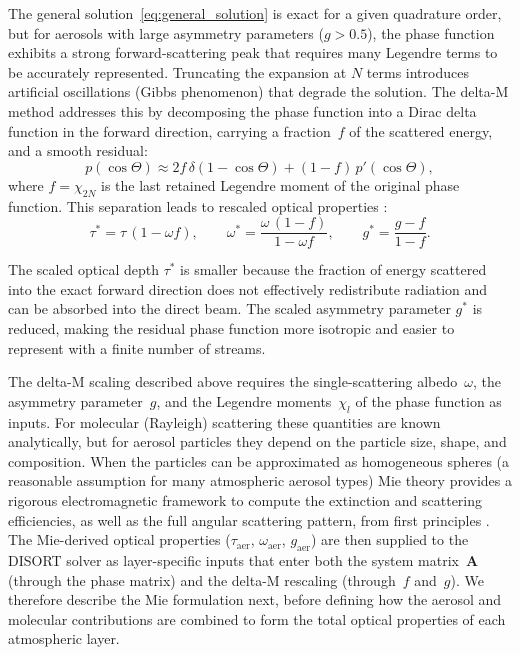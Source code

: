 \documentclass[a4paper, 11pt]{article}
\begin{document}
The general solution~\eqref{eq:general_solution} is exact for a given
quadrature order, but for aerosols with large asymmetry parameters ($g > 0.5$), the phase
function exhibits a strong forward-scattering peak that requires many
Legendre terms to be accurately represented.  Truncating the expansion
at $N$ terms introduces artificial oscillations (Gibbs phenomenon) that
degrade the solution.  The delta-M method \cite{wiscombe1977}
addresses this by decomposing the phase function into a Dirac delta
function in the forward direction, carrying a fraction~$f$ of the
scattered energy, and a smooth residual:
%
\begin{equation}
  p(\cos\Theta) \approx 2f\,\delta(1-\cos\Theta)
  + (1-f)\,p'(\cos\Theta),
  \label{eq:deltam_decomp}
\end{equation}
%
where $f = \chi_{2N}$ is the last retained Legendre moment of the
original phase function.  This separation leads to rescaled optical
properties \cite{wiscombe1977,disortreport}:
%
\begin{equation}
  \tau^* = \tau\,(1 - \omega f),\qquad
  \omega^* = \frac{\omega\,(1-f)}{1 - \omega f},\qquad
  g^* = \frac{g - f}{1 - f}.
  \label{eq:deltam_scaling}
\end{equation}

The scaled optical depth $\tau^*$ is smaller because the fraction of
energy scattered into the exact forward direction does not effectively
redistribute radiation and can be absorbed into the direct beam.
The scaled asymmetry parameter $g^*$ is reduced, making the residual
phase function more isotropic and easier to represent with a finite
number of streams.

The delta-M scaling described above requires the single-scattering
albedo~$\omega$, the asymmetry parameter~$g$, and the Legendre
moments~$\chi_l$ of the phase function as inputs.  For molecular
(Rayleigh) scattering these quantities are known analytically, but for
aerosol particles they depend on the particle size, shape, and
composition.  When the particles can be approximated as homogeneous
spheres (a reasonable assumption for many atmospheric aerosol
types) Mie theory provides a rigorous electromagnetic framework to
compute the extinction and scattering efficiencies, as well as the
full angular scattering pattern, from first principles
\cite{bohren1983,vandeHulst1957}.  The Mie-derived optical properties
($\tau_{\text{aer}}$, $\omega_{\text{aer}}$, $g_{\text{aer}}$) are
then supplied to the DISORT solver as layer-specific inputs that enter
both the system matrix~$\mathbf{A}$ (through the phase matrix) and the
delta-M rescaling (through~$f$ and~$g$).  We therefore describe the Mie
formulation next, before defining how the aerosol and molecular
contributions are combined to form the total optical properties of each
atmospheric layer.
\end{document}
